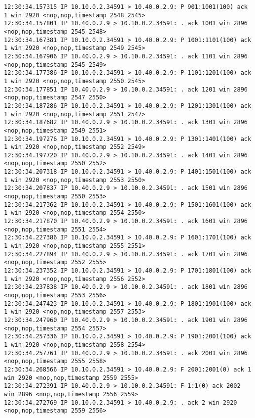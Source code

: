 \documentclass[a4paper,12pt]{article}
\begin{document}
\begin{lstlisting}
12:30:34.157315 IP 10.10.0.2.34591 > 10.40.0.2.9: P 901:1001(100) ack 1 win 2920 <nop,nop,timestamp 2548 2545>
12:30:34.157801 IP 10.40.0.2.9 > 10.10.0.2.34591: . ack 1001 win 2896 <nop,nop,timestamp 2545 2548>
12:30:34.167381 IP 10.10.0.2.34591 > 10.40.0.2.9: P 1001:1101(100) ack 1 win 2920 <nop,nop,timestamp 2549 2545>
12:30:34.167906 IP 10.40.0.2.9 > 10.10.0.2.34591: . ack 1101 win 2896 <nop,nop,timestamp 2545 2549>
12:30:34.177386 IP 10.10.0.2.34591 > 10.40.0.2.9: P 1101:1201(100) ack 1 win 2920 <nop,nop,timestamp 2550 2545>
12:30:34.177851 IP 10.40.0.2.9 > 10.10.0.2.34591: . ack 1201 win 2896 <nop,nop,timestamp 2547 2550>
12:30:34.187286 IP 10.10.0.2.34591 > 10.40.0.2.9: P 1201:1301(100) ack 1 win 2920 <nop,nop,timestamp 2551 2547>
12:30:34.187682 IP 10.40.0.2.9 > 10.10.0.2.34591: . ack 1301 win 2896 <nop,nop,timestamp 2549 2551>
12:30:34.197276 IP 10.10.0.2.34591 > 10.40.0.2.9: P 1301:1401(100) ack 1 win 2920 <nop,nop,timestamp 2552 2549>
12:30:34.197720 IP 10.40.0.2.9 > 10.10.0.2.34591: . ack 1401 win 2896 <nop,nop,timestamp 2550 2552>
12:30:34.207318 IP 10.10.0.2.34591 > 10.40.0.2.9: P 1401:1501(100) ack 1 win 2920 <nop,nop,timestamp 2553 2550>
12:30:34.207837 IP 10.40.0.2.9 > 10.10.0.2.34591: . ack 1501 win 2896 <nop,nop,timestamp 2550 2553>
12:30:34.217362 IP 10.10.0.2.34591 > 10.40.0.2.9: P 1501:1601(100) ack 1 win 2920 <nop,nop,timestamp 2554 2550>
12:30:34.217870 IP 10.40.0.2.9 > 10.10.0.2.34591: . ack 1601 win 2896 <nop,nop,timestamp 2551 2554>
12:30:34.227386 IP 10.10.0.2.34591 > 10.40.0.2.9: P 1601:1701(100) ack 1 win 2920 <nop,nop,timestamp 2555 2551>
12:30:34.227894 IP 10.40.0.2.9 > 10.10.0.2.34591: . ack 1701 win 2896 <nop,nop,timestamp 2552 2555>
12:30:34.237352 IP 10.10.0.2.34591 > 10.40.0.2.9: P 1701:1801(100) ack 1 win 2920 <nop,nop,timestamp 2556 2552>
12:30:34.237838 IP 10.40.0.2.9 > 10.10.0.2.34591: . ack 1801 win 2896 <nop,nop,timestamp 2553 2556>
12:30:34.247423 IP 10.10.0.2.34591 > 10.40.0.2.9: P 1801:1901(100) ack 1 win 2920 <nop,nop,timestamp 2557 2553>
12:30:34.247960 IP 10.40.0.2.9 > 10.10.0.2.34591: . ack 1901 win 2896 <nop,nop,timestamp 2554 2557>
12:30:34.257336 IP 10.10.0.2.34591 > 10.40.0.2.9: P 1901:2001(100) ack 1 win 2920 <nop,nop,timestamp 2558 2554>
12:30:34.257761 IP 10.40.0.2.9 > 10.10.0.2.34591: . ack 2001 win 2896 <nop,nop,timestamp 2555 2558>
12:30:34.268566 IP 10.10.0.2.34591 > 10.40.0.2.9: F 2001:2001(0) ack 1 win 2920 <nop,nop,timestamp 2559 2555>
12:30:34.272391 IP 10.40.0.2.9 > 10.10.0.2.34591: F 1:1(0) ack 2002 win 2896 <nop,nop,timestamp 2556 2559>
12:30:34.272769 IP 10.10.0.2.34591 > 10.40.0.2.9: . ack 2 win 2920 <nop,nop,timestamp 2559 2556>
\end{lstlisting}
\end{document}

